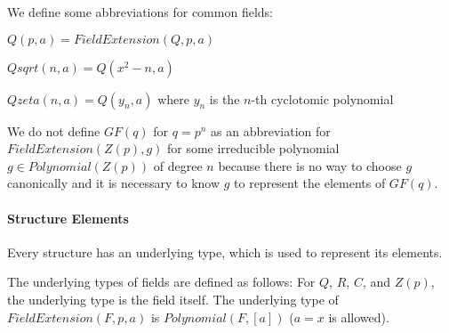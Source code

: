 We define some abbreviations for common fields:
\begin{compactitem}
 \item $Q(p,a)=FieldExtension(Q,p,a)$
 \item $Qsqrt(n,a)=Q(x^2-n,a)$
 \item $Qzeta(n,a)=Q(y_n,a)$ where $y_n$ is the $n$-th cyclotomic polynomial
\end{compactitem}

We do not define $GF(q)$ for $q=p^n$ as an abbreviation for $FieldExtension(Z(p),g)$ for some irreducible polynomial $g\in Polynomial(Z(p))$ of degree $n$ because there is no way to choose $g$ canonically and it is necessary to know $g$ to represent the elements of $GF(q)$.

\paragraph{Structure Elements}
Every structure has an underlying type, which is used to represent its elements.

The underlying types of fields are defined as follows:
For $Q$, $R$, $C$, and $Z(p)$, the underlying type is the field itself.
The underlying type of $FieldExtension(F,p,a)$ is $Polynomial(F,[a])$ ($a=x$ is allowed).

